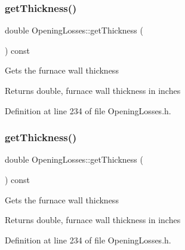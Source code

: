 \mbox{\label{class_opening_losses_aeefdf4431056de65ca84c6dfb24b61e1}} 
\subsubsection{\texorpdfstring{get\+Thickness()}{getThickness()}\hspace{0.1cm}{\footnotesize\ttfamily [2/3]}}
{\footnotesize\ttfamily double Opening\+Losses\+::get\+Thickness (\begin{DoxyParamCaption}{ }\end{DoxyParamCaption}) const\hspace{0.3cm}{\ttfamily [inline]}}

Gets the furnace wall thickness

\begin{DoxyReturn}{Returns}
double, furnace wall thickness in inches 
\end{DoxyReturn}


Definition at line 234 of file Opening\+Losses.\+h.

\mbox{\label{class_opening_losses_aeefdf4431056de65ca84c6dfb24b61e1}} 
\subsubsection{\texorpdfstring{get\+Thickness()}{getThickness()}\hspace{0.1cm}{\footnotesize\ttfamily [3/3]}}
{\footnotesize\ttfamily double Opening\+Losses\+::get\+Thickness (\begin{DoxyParamCaption}{ }\end{DoxyParamCaption}) const\hspace{0.3cm}{\ttfamily [inline]}}

Gets the furnace wall thickness

\begin{DoxyReturn}{Returns}
double, furnace wall thickness in inches 
\end{DoxyReturn}


Definition at line 234 of file Opening\+Losses.\+h.

\mbox{\label{class_opening_losses_ae6633fab7a941e00b9770bee6a3af34d}} 
